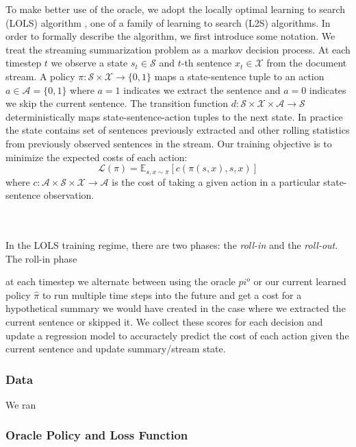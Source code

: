 To make better use of the oracle, we adopt the locally optimal learning to
search (LOLS) algorithm \cite{lols}, one of a family of learning to search 
(L2S) algorithms. In order to formally describe the algorithm, we first 
introduce some notation. We treat the streaming summarization problem
as a markov decision process. At each timestep $t$ we observe a state
$s_t \in \mathcal{S}$ and $t$-th sentence $x_t \in \mathcal{X}$ from the 
document stream.
A policy $\pi : \mathcal{S} \times \mathcal{X} \rightarrow \{0, 1\}$
maps a state-sentence tuple to an action $a \in \mathcal{A} =\{0,1\}$
where $a=1$ indicates we extract the sentence and $a=0$ indicates we skip
the current sentence. The transition function 
$d : \mathcal{S} \times \mathcal{X} \times \mathcal{A} \rightarrow \mathcal{S}$
deterministically maps state-sentence-action tuples to the next state. 
In practice the state contains set of sentences previously extracted and
other rolling statistics from previously observed sentences in the stream.
Our training objective is to minimize the expected costs of each action:
\[ \mathcal{L}(\pi) = \mathbb{E}_{s,x \sim \pi} \left[ c\left(\pi(s,x), s, x\right) \right] \]
where $c :\mathcal{A} \times \mathcal{S} \times \mathcal{X} \rightarrow \mathcal{A}$ is the cost of taking a given action in a particular state-sentence
observation.

~\\

~\\

In the LOLS training regime, there are two phases: the 
\emph{roll-in} and the \emph{roll-out}. The roll-in phase 

at each timestep 
we alternate between using the oracle $pi^o$ or our current learned policy
$\hat{\pi}$ to run multiple time steps into the future and get a cost for 
a hypothetical summary we would have created in the case where we extracted the 
current sentence or skipped it. We collect these scores for each decision
and update a regression model to accuractely predict the cost of each action
given the current sentence and update summary/stream state.





\subsubsection{Data}
We ran 

\subsubsection{Oracle Policy and Loss Function}


